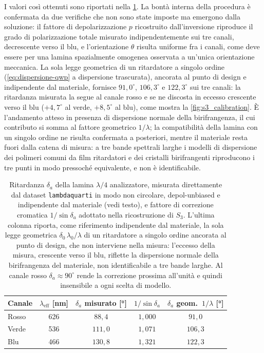 I valori così ottenuti sono riportati nella \cref{tab:s3_calibrazione}. La bontà interna della procedura è confermata da due verifiche che non sono state imposte ma emergono dalla soluzione: il fattore di depolarizzazione $p$ ricostruito dall'inversione riproduce il grado di polarizzazione totale misurato indipendentemente sui tre canali, decrescente verso il blu, e l'orientazione $\theta$ risulta uniforme fra i canali, come deve essere per una lamina spazialmente omogenea osservata a un'unica orientazione meccanica. La sola legge geometrica di un ritardatore a singolo ordine (\cref{eq:dispersione-qwp} a dispersione trascurata), ancorata al punto di design e indipendente dal materiale, fornisce $91{,}0^\circ$, $106{,}3^\circ$ e $122{,}3^\circ$ sui tre canali: la ritardanza misurata la segue al canale rosso e se ne discosta in eccesso crescente verso il blu ($+4{,}7^\circ$ al verde, $+8{,}5^\circ$ al blu), come mostra la \cref{fig:s3_calibration}. È l'andamento atteso in presenza di dispersione normale della birifrangenza, il cui contributo si somma al fattore geometrico $1/\lambda$; la compatibilità della lamina con un singolo ordine ne risulta confermata a posteriori, mentre il materiale resta fuori dalla catena di misura: a tre bande spettrali larghe i modelli di dispersione dei polimeri comuni da film ritardatori e dei cristalli birifrangenti riproducono i tre punti in modo pressoché equivalente, e non è identificabile.

\begin{table}[H]
    \centering
    \caption{Ritardanza $\delta_a$ della lamina $\lambda/4$ analizzatore, misurata direttamente dal dataset \texttt{lambdaquarti} in modo non circolare, depol-unbiased e indipendente dal materiale (vedi testo), e fattore di correzione cromatica $1/\sin\delta_a$ adottato nella ricostruzione di $S_3$. L'ultima colonna riporta, come riferimento indipendente dal materiale, la sola legge geometrica $\delta_0\,\lambda_0/\lambda$ di un ritardatore a singolo ordine ancorata al punto di design, che non interviene nella misura: l'eccesso della misura, crescente verso il blu, riflette la dispersione normale della birifrangenza del materiale, non identificabile a tre bande larghe. Al canale rosso $\delta_a \approx 90^\circ$ rende la correzione prossima all'unità e quindi insensibile a ogni scelta di modello.}
    \label{tab:s3_calibrazione}
    \begin{tabular}{lcccc}
        \hline
        \textbf{Canale} & $\lambda_\mathrm{eff}$ [\si{\nano\meter}] & $\delta_a$ misurato [\si{\degree}] & $1/\sin\delta_a$ & $\delta_a$ geom.\ $1/\lambda$ [\si{\degree}] \\
        \hline
        Rosso & 626 & $88{,}4$  & $1{,}000$ & $91{,}0$  \\
        Verde & 536 & $111{,}0$ & $1{,}071$ & $106{,}3$ \\
        Blu   & 466 & $130{,}8$ & $1{,}321$ & $122{,}3$ \\
        \hline
    \end{tabular}
\end{table}

